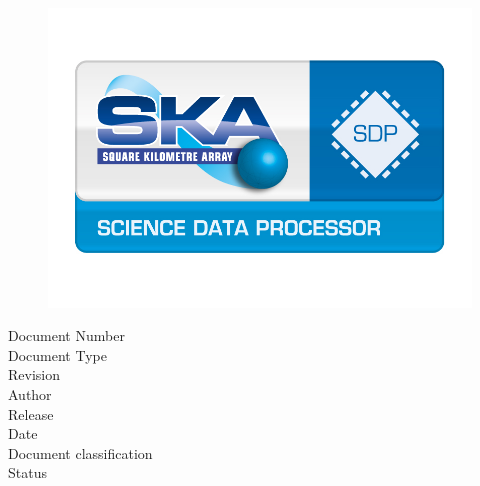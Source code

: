 \thispagestyle{empty}


\setlength{\unitlength}{1mm}


\phantom{test}
\begin{figure}[h]
  \centering
  \includegraphics[width=\textwidth]{figs/logos/science_data_processor_logo.jpg}
\end{figure}

\vspace{-1cm}

\begin{center}
\fontsize{22}{24}\selectfont \sffamily\bigdoctitle
\end{center}

\vspace{1cm}

\noindent\normalsize{Document Number \dotfill \docnr}\\
\normalsize{Document Type \dotfill \context}\\
\normalsize{Revision \dotfill \revision}\\
\normalsize{Author \dotfill \docauthor}\\
\normalsize{Release \dotfill \release}\\
\normalsize{Date \dotfill \docudate}\\
\normalsize{Document classification \dotfill \classification}\\
\normalsize{Status \dotfill \docstatus}

\vspace{1.5cm}

\begin{center}
\signaturetable
\end{center}


\newpage


\begin{center}
\versiontable
\end{center}

\vspace{1cm}

\begin{center}
\organisationtable
\end{center}

